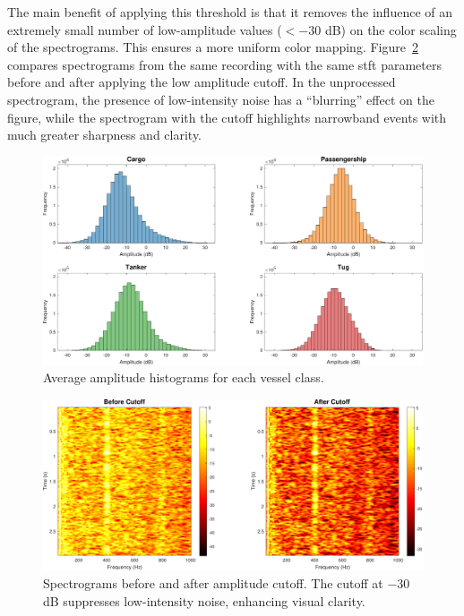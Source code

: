 The main benefit of applying this threshold is that it removes the influence of an extremely small number of low-amplitude values ($<-30$ dB) on the color scaling of the spectrograms. This ensures a more uniform color mapping. Figure~\ref{fig:ampl-cutoff-spectrogram} compares spectrograms from the same recording with the same \acrshort{stft} parameters before and after applying the low amplitude cutoff. In the unprocessed spectrogram, the presence of low-intensity noise has a ``blurring'' effect on the figure, while the spectrogram with the cutoff highlights narrowband events with much greater sharpness and clarity.

\begin{figure}[p]
    \centering
    \includegraphics[width=\textwidth]{img/ch3/ampl_cutoff/averageHistogram.pdf}
    \caption{Average amplitude histograms for each vessel class.}
    \label{fig:ampl-cutoff-histogram}
\end{figure}

\begin{figure}[p]
    \centering
    \includegraphics[width=\textwidth]{img/ch3/ampl_cutoff/amplCutoffComparison.pdf}
    \caption{Spectrograms before and after amplitude cutoff. The cutoff at $-30$ dB suppresses low-intensity noise, enhancing visual clarity.}
    \label{fig:ampl-cutoff-spectrogram}
\end{figure}

